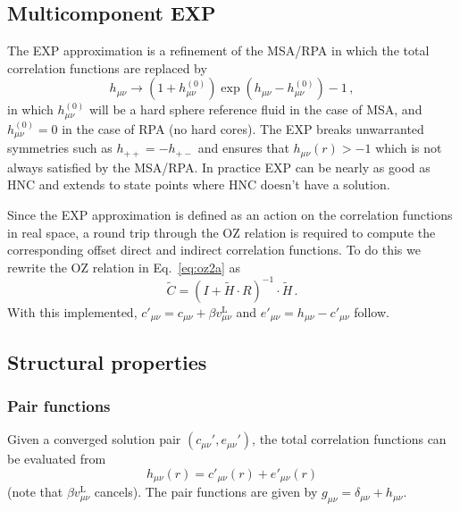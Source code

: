 \documentclass[12pt,a4paper]{article}
\newcommand{\lr}{^{\mathrm{L}}}
\newcommand{\href}{h^{(0)}}
\newcommand{\Eqref}[1]{Eq.~\eqref{#1}}
\begin{document}
\subsection{Multicomponent EXP}\label{sec:EXP}
%
The EXP approximation is a  refinement of the MSA/RPA
in which the  total correlation functions are replaced by
%
\begin{equation}
  h_{\mu\nu}\to(1+\href_{\mu\nu})\exp(h_{\mu\nu}-\href_{\mu\nu})-1\,,
  \label{eq:exp}
\end{equation}
%
in which $\href_{\mu\nu}$ will be a hard sphere reference fluid in
the case of MSA, and $\href_{\mu\nu}=0$ in the case of RPA (no hard
cores).  The EXP breaks unwarranted symmetries such as
$h_{++}=-h_{+-}$ and ensures that $h_{\mu\nu}(r)>-1$ which is not
always satisfied by the MSA/RPA.  In practice EXP can be nearly as
good as HNC and extends to state points where HNC doesn't have a
solution.

Since the EXP approximation is defined as an action on the correlation
functions in real space, a round trip through the OZ relation is
required to compute the corresponding offset direct and indirect
correlation functions.  To do this we rewrite the OZ relation in
\Eqref{eq:oz2a} as
%
\begin{equation}
{\tilde C} = (I+{\tilde H}\cdot R)^{-1}\cdot{\tilde H}\,.
\label{eq:ozndb}
\end{equation}
%
With this implemented, $c'_{\mu\nu}=c_{\mu\nu}+\beta
v\lr_{\mu\nu}$ and $e'_{\mu\nu}= h_{\mu\nu} - c'_{\mu\nu}$ follow.

\subsection{Structural properties}
%
\subsubsection{Pair functions}
%
Given a converged solution pair $(c_{\mu\nu}', e_{\mu\nu}')$, the
total correlation functions can be evaluated from
%
\begin{equation}
h_{\mu\nu}(r) = c'_{\mu\nu}(r) +  e'_{\mu\nu}(r)\label{eq:hrs}
\end{equation}
%
(note that $\beta v_{\mu\nu}\lr$ cancels).  The pair functions are
given by $g_{\mu\nu}=\delta_{\mu\nu}+h_{\mu\nu}$.
\end{document}
